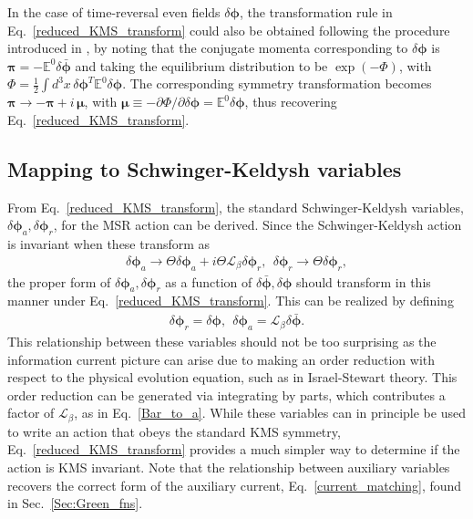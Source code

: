 \documentclass[aps,prd,nofootinbib,amsmath,amssymb,showpacs,longbibliography,singlecolumn,superscriptaddress,notitlepage]{revtex4-1}
\theoremstyle{plain}
\theoremstyle{definition}
\newcommand{\cvec}[1]{\ensuremath{\bm {#1}}}
\newcommand{\cmat}[1]{\ensuremath{\mathds{{#1}}}}
\begin{document}
In the case of time-reversal even fields $\delta\cvec{\phi}$, the transformation rule in Eq.~\eqref{reduced_KMS_transform} could also be obtained following the procedure introduced in \cite{Guo:2022ixk}, by noting that the conjugate momenta corresponding to $\delta\cvec{\phi}$ is $\cvec{\pi}=-\cmat{E}^0\delta\bar{\cvec{\phi}}$ and taking the equilibrium distribution to be $\exp\left(-\Phi \right)$, with $\Phi = \frac{1}{2}\int d^3x\, \delta\cvec{\phi}^T \cmat{E}^0\delta\cvec{\phi}$. The corresponding symmetry transformation becomes $\cvec{\pi} \to -\cvec{\pi} + i\,\cvec{\mu}$, with $\cvec{\mu} \equiv - \partial \Phi/\partial\delta\cvec{\phi} = \cmat{E}^0 \delta\cvec{\phi}$, thus recovering Eq.~\eqref{reduced_KMS_transform}.

\subsection{Mapping to Schwinger-Keldysh variables}
\label{Sec:Mapping_SK}

From Eq.~\eqref{reduced_KMS_transform}, the standard Schwinger-Keldysh variables, $\delta \cvec{\phi}_a, \delta \cvec{\phi}_r$, for the MSR action can be derived. Since the Schwinger-Keldysh action is invariant when these transform as
\begin{eqnarray} \label{KMS_standard}
    \delta \cvec{\phi}_a \rightarrow \Theta \delta \cvec{\phi}_a + i \Theta \mathcal{L}_{\beta} \delta \cvec{\phi}_r , \:\: \delta \cvec{\phi}_r \rightarrow \Theta \delta \cvec{\phi}_r ,
\end{eqnarray}
the proper form of $\delta \cvec{\phi}_a, \delta \cvec{\phi}_r$ as a function of $\delta \bar{\cvec{\phi}}, \delta \cvec{\phi}$ should transform in this manner under Eq.\ \eqref{reduced_KMS_transform}. This can be realized by defining
\begin{eqnarray} \label{Bar_to_a}
    \delta \cvec{\phi}_r = \delta \cvec{\phi} , \:\: \delta \cvec{\phi}_a = \mathcal{L}_{\beta} \delta \bar{\cvec{\phi}} .
\end{eqnarray}
This relationship between these variables should not be too surprising as the information current picture can arise due to making an order reduction with respect to the physical evolution equation, such as in Israel-Stewart theory. This order reduction can be generated via integrating by parts, which contributes a factor of $\mathcal{L}_{\beta}$, as in Eq.\ \eqref{Bar_to_a}. While these variables can in principle be used to write an action that obeys the standard KMS symmetry, Eq.\ \eqref{reduced_KMS_transform} provides a much simpler way to determine if the action is KMS invariant. Note that the relationship between auxiliary variables recovers the correct form of the auxiliary current, Eq.\ \eqref{current_matching}, found in Sec.\ \ref{Sec:Green_fns}.
\end{document}
